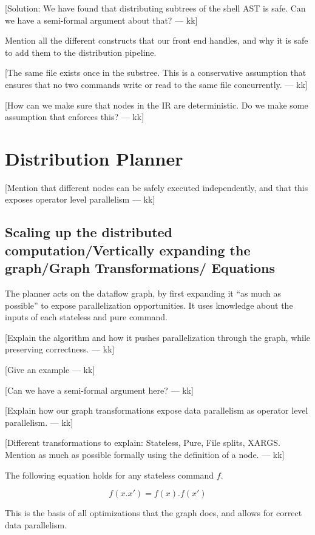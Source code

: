 \documentclass[sigplan,10pt,review,anonymous]{acmart}
\newcommand{\kk}[1]{[{\color{magenta}#1 --- kk}]}
\begin{document}
\kk{Solution: We have found that distributing subtrees of the shell
  AST is safe. Can we have a semi-formal argument about that?}

Mention all the different constructs that our front end handles, and
why it is safe to add them to the distribution pipeline.

\kk{The same file exists once in the substree. This is a conservative
  assumption that ensures that no two commands write or read to the
  same file concurrently.}

\kk{How can we make sure that nodes in the IR are deterministic. Do we
  make some assumption that enforces this?}


\section{Distribution Planner}

\kk{Mention that different nodes can be safely executed independently,
  and that this exposes operator level parallelism}

\subsection{Scaling up the distributed computation/Vertically expanding the graph/Graph Transformations/ Equations}

The planner acts on the dataflow graph, by first expanding it ``as
much as possible'' to expose parallelization opportunities. It uses
knowledge about the inputs of each stateless and pure command.

\kk{Explain the algorithm and how it pushes parallelization through
  the graph, while preserving correctness.}

\kk{Give an example}

\kk{Can we have a semi-formal argument here?}

\kk{Explain how our graph transformations expose data parallelism as
  operator level parallelism.}

\kk{Different transformations to explain: Stateless, Pure, File
  splits, XARGS. Mention as much as possible formally using the
  definition of a node.}

The following equation holds for any stateless command $f$.

\[
f(x.x') = f(x).f(x')
\]

This is the basis of all optimizations that the graph does, and allows
for correct data parallelism.
\end{document}

